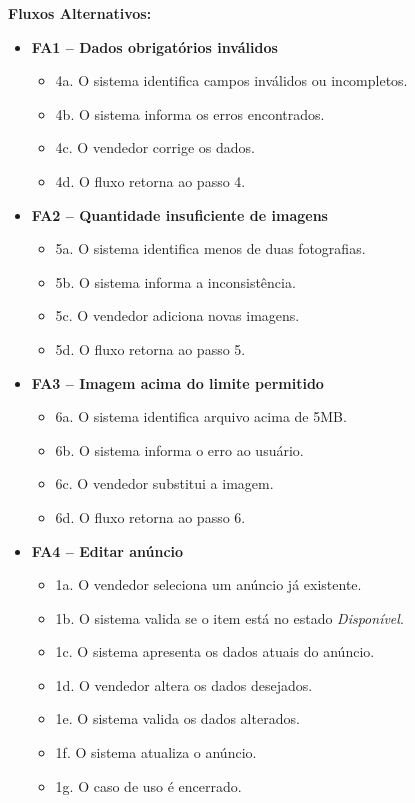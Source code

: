 ﻿\documentclass[12pt,a4paper]{article}
\begin{document}
\vspace{0.5em}
\noindent\textbf{Fluxos Alternativos:}
\begin{itemize}[leftmargin=*]
    \item \textbf{FA1 – Dados obrigatórios inválidos}
    \begin{itemize}[label={}, leftmargin=0.5cm]
        \item 4a. O sistema identifica campos inválidos ou incompletos.
        \item 4b. O sistema informa os erros encontrados.
        \item 4c. O vendedor corrige os dados.
        \item 4d. O fluxo retorna ao passo 4.
    \end{itemize}
    
    \item \textbf{FA2 – Quantidade insuficiente de imagens}
    \begin{itemize}[label={}, leftmargin=0.5cm]
        \item 5a. O sistema identifica menos de duas fotografias.
        \item 5b. O sistema informa a inconsistência.
        \item 5c. O vendedor adiciona novas imagens.
        \item 5d. O fluxo retorna ao passo 5.
    \end{itemize}

    \item \textbf{FA3 – Imagem acima do limite permitido}
    \begin{itemize}[label={}, leftmargin=0.5cm]
        \item 6a. O sistema identifica arquivo acima de 5MB.
        \item 6b. O sistema informa o erro ao usuário.
        \item 6c. O vendedor substitui a imagem.
        \item 6d. O fluxo retorna ao passo 6.
    \end{itemize}

    \item \textbf{FA4 – Editar anúncio}
    \begin{itemize}[label={}, leftmargin=0.5cm]
        \item 1a. O vendedor seleciona um anúncio já existente.
        \item 1b. O sistema valida se o item está no estado \textit{Disponível}.
        \item 1c. O sistema apresenta os dados atuais do anúncio.
        \item 1d. O vendedor altera os dados desejados.
        \item 1e. O sistema valida os dados alterados.
        \item 1f. O sistema atualiza o anúncio.
        \item 1g. O caso de uso é encerrado.
    \end{itemize}


\end{itemize}
\end{document}
